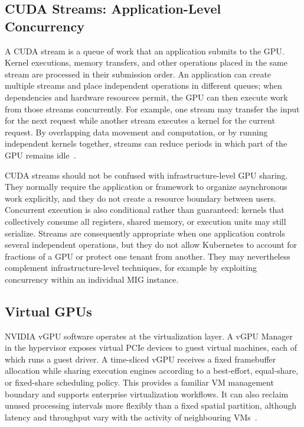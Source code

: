 \subsection{CUDA Streams: Application-Level Concurrency}

A CUDA stream is a queue of work that an application submits to the GPU. Kernel executions, memory transfers, and other operations placed in the same stream are processed in their submission order. An application can create multiple streams and place independent operations in different queues; when dependencies and hardware resources permit, the GPU can then execute work from those streams concurrently. For example, one stream may transfer the input for the next request while another stream executes a kernel for the current request. By overlapping data movement and computation, or by running independent kernels together, streams can reduce periods in which part of the GPU remains idle~\cite{nvidia2026cudastreams}.

CUDA streams should not be confused with infrastructure-level GPU sharing. They normally require the application or framework to organize asynchronous work explicitly, and they do not create a resource boundary between users. Concurrent execution is also conditional rather than guaranteed: kernels that collectively consume all registers, shared memory, or execution units may still serialize. Streams are consequently appropriate when one application controls several independent operations, but they do not allow Kubernetes to account for fractions of a GPU or protect one tenant from another. They may nevertheless complement infrastructure-level techniques, for example by exploiting concurrency within an individual MIG instance.

\subsection{Virtual GPUs}

NVIDIA vGPU software operates at the virtualization layer. A vGPU Manager in the hypervisor exposes virtual PCIe devices to guest virtual machines, each of which runs a guest driver. A time-sliced vGPU receives a fixed framebuffer allocation while sharing execution engines according to a best-effort, equal-share, or fixed-share scheduling policy. This provides a familiar VM management boundary and supports enterprise virtualization workflows. It can also reclaim unused processing intervals more flexibly than a fixed spatial partition, although latency and throughput vary with the activity of neighbouring VMs~\cite{nvidia2026vgpu}.

